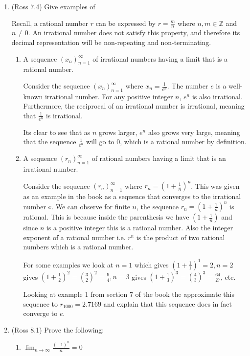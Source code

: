 \documentclass [10pt]{article}
\newcommand{\jg}[1]{{\color{blue} #1}}
\begin{document}
\begin{enumerate}

\item (Ross 7.4) Give examples of

\jg{
Recall, a rational number $r$ can be expressed by $r = \frac{m}{n}$ where $n, m \in \mathbb{Z}$ and $n \neq 0$. An irrational number does not satisfy this property, and therefore its decimal representation will be non-repeating and non-terminating.  
}
\begin{enumerate}
\item A sequence $(x_n)_{n=1}^{\infty}$ of irrational numbers having a
limit that is a rational number. 

\jg{
Consider the sequence $(x_n)_{n=1}^{\infty}$ where $x_n = \frac{1}{e^n}$. The number $e$ is a well-known irrational number. For any positive integer $n$, $e^n$ is also irrational. Furthermore, the reciprocal of an irrational number is irrational, meaning that $\frac{1}{e^n}$ is irrational. 

Its clear to see that as $n$ grows larger, $e^n$ also grows very large, meaning that the sequence $\frac{1}{e^n}$ will go to 0, which is a rational number by definition. 
}

\item A sequence $(r_n)_{n=1}^{\infty}$ of rational numbers having a limit
that is an irrational number.

\jg{
Consider the sequence $(r_n)_{n=1}^{\infty}$ where $r_n = (1+\frac{1}{n})^n$. This was given as an example in the book as a sequence that converges to the irrational number $e$. We can observe for finite $n$, the sequence $r_n = (1+\frac{1}{n})^n$ is rational. This is because inside the parenthesis we have $(1+ \frac{1}{n})$ and since $n$ is a positive integer this is a rational number. Also the integer exponent of a rational number i.e. $r^n$ is the product of two rational numbers which is a rational number.

For some examples we look at $n=1$ which gives $(1+\frac{1}{1})^1 = 2, n=2$ gives $(1+\frac{1}{2})^2 = (\frac{3}{2})^2 = \frac{9}{4}, n=3$ gives $(1+\frac{1}{3})^3 = (\frac{4}{3})^3 = \frac{64}{27}$, etc. 

Looking at example 1 from section 7 of the book the approximate this sequence to $r_{1000} = 2.7169$ and explain that this sequence does in fact converge to $e$. 
}
\end{enumerate}
\clearpage

\item (Ross 8.1) Prove the following:
\begin{enumerate}
\item $\lim_{n \to \infty} \frac{(-1)^n}{n}=0$


\end{enumerate}
\end{enumerate}
\end{document}
